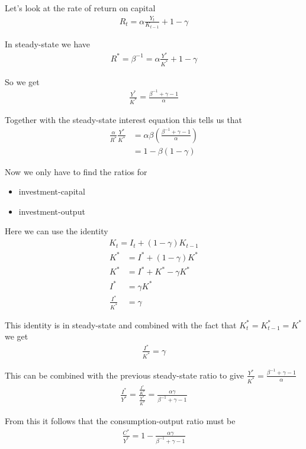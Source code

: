 \documentclass{beamer}
\begin{document}
\begin{frame}
   Let's look at the rate of return on capital
\begin{align}
  R_t=\alpha \frac{Y_t}{K_{t-1}}+1-\gamma
\end{align}

In steady-state we have
\begin{align}
  R^*= \beta^{-1} = \alpha \frac{Y^*}{K^*}+1-\gamma
\end{align}

So we get
\begin{align}
  \frac{Y^*}{K^*}=\frac{\beta^{-1}+\gamma-1}{\alpha}
\end{align}

Together with the steady-state interest equation this tells us that
\begin{align}
  \frac{\alpha}{R^*}\frac{Y^*}{K^*} &=\alpha \beta \left(\frac{\beta^{-1}+\gamma-1}{\alpha} \right)\\
  &= 1-\beta(1-\gamma)
\end{align}
\end{frame}

\begin{frame}
  Now we only have to find the ratios for 
\begin{itemize}
  \item investment-capital
  \item investment-output
\end{itemize}
Here we can use the identity
\begin{align} K_t=I_t+(1-\gamma)K_{t-1} \end{align}
\begin{align}
  K^* &= I^* + (1-\gamma)K^*\\
  K^* &= I^* + K^* - \gamma K^*\\
  I^* &= \gamma K^*\\
  \frac{I^*}{K^*} &= \gamma
\end{align}


\end{frame}

\begin{frame}
This identity is in steady-state and combined with the fact that $K^*_t=K^*_{t-1}=K^*$ we get
\begin{align} \frac{I^*}{K^*}=\gamma \end{align}


This can be combined with the previous steady-state ratio to give
$\frac{Y^*}{K^*}=\frac{\beta^{-1}+\gamma-1}{\alpha}$
\begin{align}
  \frac{I^*}{Y^*}=\frac{\frac{I^*}{K^*}}{\frac{Y^*}{K^*}}=\frac{\alpha \gamma}{\beta^{-1}+\gamma-1}
\end{align}

From this it follows that the consumption-output ratio must be
\begin{align}
  \frac{C^*}{Y^*}=1-\frac{\alpha \gamma}{\beta^{-1}+\gamma-1}
\end{align}
\end{frame}
\end{document}
